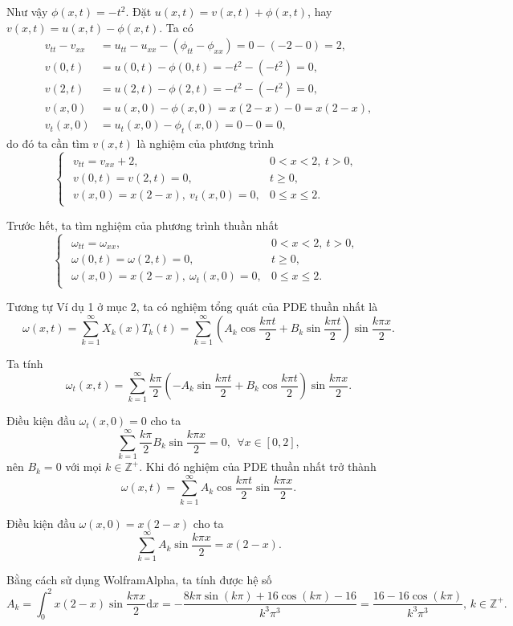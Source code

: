 \documentclass[10pt, a4paper]{article}
\begin{document}
	Như vậy $\phi(x,t)=-t^2$. Đặt $u(x,t)=v(x,t)+\phi(x,t)$, hay $v(x,t)=u(x,t)-\phi(x,t)$. Ta có \begin{align*}
		v_{tt}-v_{xx}&=u_{tt}-u_{xx}-(\phi_{tt}-\phi_{xx})=0-(-2-0)=2,\\
		v(0,t)&=u(0,t)-\phi(0,t)=-t^2-(-t^2)=0,\\
		v(2,t)&=u(2,t)-\phi(2,t)=-t^2-(-t^2)=0,\\
		v(x,0)&=u(x,0)-\phi(x,0)=x(2-x)-0=x(2-x),\\
		v_t(x,0)&=u_t(x,0)-\phi_t(x,0)=0-0=0,
	\end{align*}
	do đó ta cần tìm $v(x,t)$ là nghiệm của phương trình $$\begin{cases}
		\begin{array}{ll}
			v_{tt}=v_{xx}+2, & 0<x<2,~t>0,\\
			v(0,t)=v(2,t)=0, & t\ge0,\\
			v(x,0)=x(2-x),~v_t(x,0)=0, & 0\le x\le 2.
		\end{array}
	\end{cases}$$
	
	Trước hết, ta tìm nghiệm của phương trình thuần nhất $$\begin{cases}
		\begin{array}{ll}
			\omega_{tt}=\omega_{xx}, & 0<x<2,~t>0,\\
			\omega(0,t)=\omega(2,t)=0, & t\ge0,\\
			\omega(x,0)=x(2-x),~\omega_t(x,0)=0, & 0\le x\le 2.
		\end{array}
	\end{cases}$$
	
	Tương tự Ví dụ 1 ở mục 2, ta có nghiệm tổng quát của PDE thuần nhất là $$\omega(x,t)=\sum_{k=1}^\infty X_k(x)T_k(t)=\sum_{k=1}^\infty\left(A_k\cos\frac{k\pi t}{2}+B_k\sin\frac{k\pi t}{2}\right)\sin\frac{k\pi x}{2}.$$
	
	Ta tính $$\omega_t(x,t)=\sum_{k=1}^\infty\frac{k\pi}{2}\left(-A_k\sin\frac{k\pi t}{2}+B_k\cos\frac{k\pi t}{2}\right)\sin\frac{k\pi x}{2}.$$
	
	Điều kiện đầu $\omega_t(x,0)=0$ cho ta $$\sum_{k=1}^\infty \frac{k\pi}{2}B_k\sin\frac{k\pi x}{2}=0,~~\forall x\in[0,2],$$
	nên $B_k=0$ với mọi $k\in\mathbb Z^+$. Khi đó nghiệm của PDE thuần nhất trở thành $$\omega(x,t)=\sum_{k=1}^\infty A_k\cos\frac{k\pi t}{2}\sin\frac{k\pi x}{2}.$$
	
	Điều kiện đầu $\omega(x,0)=x(2-x)$ cho ta $$\sum_{k=1}^\infty A_k\sin\frac{k\pi x}{2}=x(2-x).$$
	
	Bằng cách sử dụng WolframAlpha, ta tính được hệ số $$A_k=\int_0^2x(2-x)\sin\frac{k\pi x}{2}\mathrm dx=-\frac{8k\pi\sin(k\pi)+16\cos(k\pi)-16}{k^3\pi^3}=\frac{16-16\cos(k\pi)}{k^3\pi^3},\,k\in\mathbb Z^+.$$
	
\end{document}
